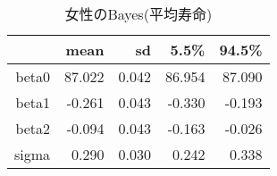 \begin{table}[ht]
\centering
\begingroup\tiny
\begin{tabular}{rrrrr}
  \hline
 & mean & sd & 5.5\% & 94.5\% \\ 
  \hline
beta0 & 87.022 & 0.042 & 86.954 & 87.090 \\ 
  beta1 & -0.261 & 0.043 & -0.330 & -0.193 \\ 
  beta2 & -0.094 & 0.043 & -0.163 & -0.026 \\ 
  sigma & 0.290 & 0.030 & 0.242 & 0.338 \\ 
   \hline
\end{tabular}
\endgroup
\caption{女性のBayes(平均寿命)} 
\label{table_Gamma_HLE_FA_m}
\end{table}
